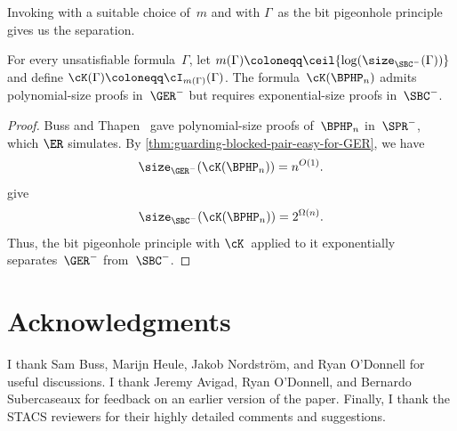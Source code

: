 \documentclass[12pt]{article}
\begin{document}
Invoking  with a suitable choice of~$m$
and with $\Gamma$~as the bit pigeonhole principle gives us the separation.

\begin{theorem}\label{thm:separation-GER-from-SBC}
  For every unsatisfiable formula~$\Gamma$,
  let $m(\Gamma) \coloneqq \ceil{\log(\size_{\SBC^-}(\Gamma))}$
  and define $\cK(\Gamma) \coloneqq \cI_{m(\Gamma)}(\Gamma)$.
  The formula~$\cK(\BPHP_n)$ admits polynomial-size proofs in~$\GER^-$
  but requires exponential-size proofs in~$\SBC^-$.
\end{theorem}
\begin{proof}
  Buss and Thapen~\cite[Theorem~4.4]{BT21}
  gave polynomial-size proofs of~$\BPHP_n$
  in~$\SPR^-$, which $\ER$ simulates.
  By \cref{thm:guarding-blocked-pair-easy-for-GER}, we have
  \begin{equation*}
    \size_{\GER^-}(\cK(\BPHP_n)) = n^{O(1)}.
  \end{equation*}
   give
  \begin{equation*}
    \size_{\SBC^-}(\cK(\BPHP_n)) = 2^{\Omega(n)}.
  \end{equation*}
  Thus, the bit pigeonhole principle with $\cK$~applied to it
  exponentially separates~$\GER^-$ from~$\SBC^-$.
\end{proof}

\section*{Acknowledgments}
\label{sec:acknowledgments}

I thank Sam Buss, Marijn Heule, Jakob Nordström, and Ryan O'Donnell
for useful discussions.
I thank Jeremy Avigad, Ryan O'Donnell, and Bernardo Subercaseaux
for feedback on an earlier version of the paper.
Finally, I thank the STACS reviewers
for their highly detailed comments and suggestions.
\end{document}
